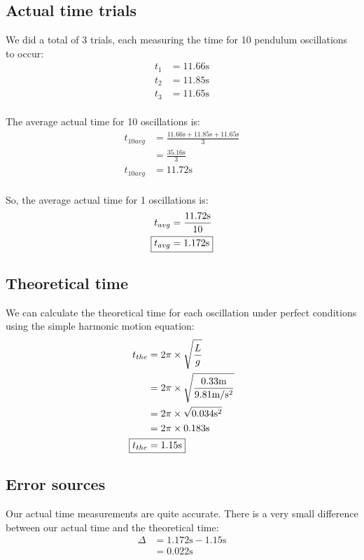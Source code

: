 \documentclass[a4paper,12pt]{article}
\begin{document}
	\subsection{Actual time trials}
	We did a total of 3 trials, each measuring the time for 10 pendulum oscillations to occur:
	\begin{align*}
		t_1&=11.66\text{s}\\
		t_2&=11.85\text{s}\\
		t_3&=11.65\text{s}
	\end{align*}\\
	The average actual time for 10 oscillations is:
	\begin{align*}
		t_{10avg}&=\frac{11.66\text{s}+11.85\text{s}+11.65\text{s}}{3}\\
		&=\frac{35.16\text{s}}{3} \\
		t_{10avg}&=11.72\text{s}\\
	\end{align*}
	
	So, the average actual time for 1 oscillations is:
	\begin{align*}
		t_{avg}&=\frac{11.72\text{s}}{10}\\
		\Aboxed{t_{avg}&=1.172\text{s}}
	\end{align*}
	
	\subsection{Theoretical time}
	We can calculate the theoretical time for each oscillation under perfect conditions using the simple harmonic motion equation:
	\begin{align*}
		t_{the}&=2\pi\times\sqrt{\frac{L}{g}}\\
		&=2\pi\times\sqrt{\frac{0.33\text{m}}{9.81\text{m}/\text{s}^2}}  \\
		&=2\pi\times\sqrt{0.034\text{s}^2}\\
		&=2\pi\times 0.183\text{s} \\
		\Aboxed{t_{the}&=1.15\text{s}}
	\end{align*} 
	
	\subsection{Error sources}
	Our actual time measurements are quite accurate. There is a very small difference between our actual time and the theoretical time:
	\begin{align*}
		\Delta&=1.172\text{s}-1.15\text{s} \\
		&=0.022\text{s}\\
	\end{align*}
	
\end{document}
